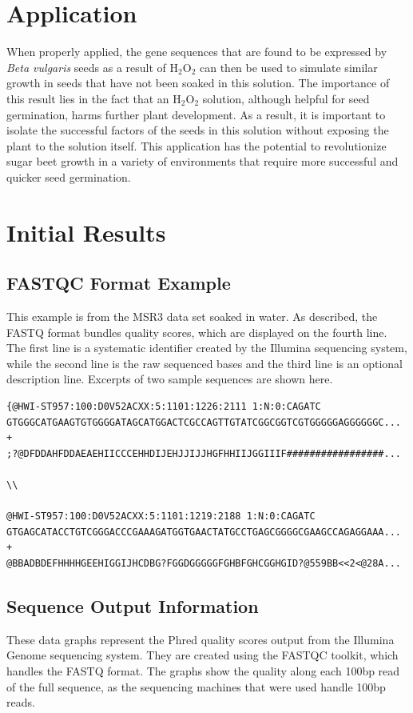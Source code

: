 \documentclass{article}
\begin{document}
\section{Application}
	When properly applied, the gene sequences that are found to be expressed by \emph{Beta vulgaris} seeds as a result of H$_{2}$O$_{2}$ can then be used to simulate similar growth in seeds that have not been soaked in this solution. The importance of this result lies in the fact that an H$_{2}$O$_{2}$ solution, although helpful for seed germination, harms further plant development. As a result, it is important to isolate the successful factors of the seeds in this solution without exposing the plant to the solution itself. This application has the potential to revolutionize sugar beet growth in a variety of environments that require more successful and quicker seed germination.

\section{Initial Results}

\subsection{FASTQC Format Example}
	This example is from the MSR3 data set soaked in water. As described, the FASTQ format bundles quality scores, which are displayed on the fourth line. The first line is a systematic identifier created by the Illumina sequencing system, while the second line is the raw sequenced bases and the third line is an optional description line. Excerpts of two sample sequences are shown here. \\
\begin{verbatim}
{@HWI-ST957:100:D0V52ACXX:5:1101:1226:2111 1:N:0:CAGATC
GTGGGCATGAAGTGTGGGGATAGCATGGACTCGCCAGTTGTATCGGCGGTCGTGGGGGAGGGGGGC...
+
;?@DFDDAHFDDAEAEHIICCCEHHDIJEHJJIJJHGFHHIIJGGIIIF#################...

\\

@HWI-ST957:100:D0V52ACXX:5:1101:1219:2188 1:N:0:CAGATC
GTGAGCATACCTGTCGGGACCCGAAAGATGGTGAACTATGCCTGAGCGGGGCGAAGCCAGAGGAAA...
+
@BBADBDEFHHHHGEEHIGGIJHCDBG?FGGDGGGGGFGHBFGHCGGHGID?@559BB<<2<@28A...
\end{verbatim}


\subsection{Sequence Output Information}
	These data graphs represent the Phred quality scores output from the Illumina Genome sequencing system. They are created using the FASTQC toolkit, which handles the FASTQ format. The graphs show the quality along each 100bp read of the full sequence, as the sequencing machines that were used handle 100bp reads. \\
\end{document}
